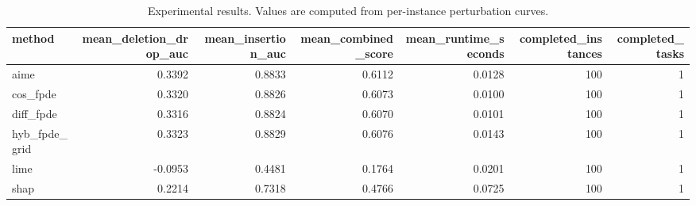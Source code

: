 \begin{table}[t]
\caption{Experimental results. Values are computed from per-instance perturbation curves.}
\label{tab:main_results_computed}
\centering
\begin{tabular}{lrrrrrr}
\toprule
method & mean\_deletion\_drop\_auc & mean\_insertion\_auc & mean\_combined\_score & mean\_runtime\_seconds & completed\_instances & completed\_tasks \\
\midrule
aime & 0.3392 & 0.8833 & 0.6112 & 0.0128 & 100 & 1 \\
cos\_fpde & 0.3320 & 0.8826 & 0.6073 & 0.0100 & 100 & 1 \\
diff\_fpde & 0.3316 & 0.8824 & 0.6070 & 0.0101 & 100 & 1 \\
hyb\_fpde\_grid & 0.3323 & 0.8829 & 0.6076 & 0.0143 & 100 & 1 \\
lime & -0.0953 & 0.4481 & 0.1764 & 0.0201 & 100 & 1 \\
shap & 0.2214 & 0.7318 & 0.4766 & 0.0725 & 100 & 1 \\
\bottomrule
\end{tabular}

\end{table}
